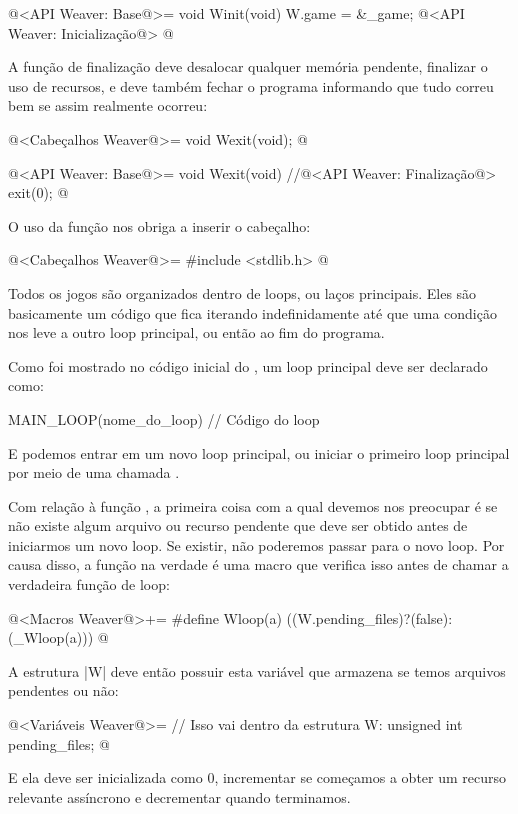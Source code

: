\iniciocodigo
@<API Weaver: Base@>=
void Winit(void){
  W.game = &_game;
  @<API Weaver: Inicialização@>
}
@
\fimcodigo

A função de finalização deve desalocar qualquer memória pendente,
finalizar o uso de recursos, e deve também fechar o programa
informando que tudo correu bem se assim realmente ocorreu:

\iniciocodigo
@<Cabeçalhos Weaver@>=
void Wexit(void);
@
\fimcodigo

\iniciocodigo
@<API Weaver: Base@>=
void Wexit(void){
  //@<API Weaver: Finalização@>
  exit(0);
}
@
\fimcodigo

O uso da função  nos obriga a inserir o cabeçalho:

\iniciocodigo
@<Cabeçalhos Weaver@>=
#include <stdlib.h>
@
\fimcodigo


Todos os jogos são organizados dentro de loops, ou laços
principais. Eles são basicamente um código que fica iterando
indefinidamente até que uma condição nos leve a outro loop principal,
ou então ao fim do programa.

Como foi mostrado no código inicial do , um loop
principal deve ser declarado como:

\inicioverbatim
MAIN\_LOOP(nome\_do\_loop){
  // Código do loop
}
\fimverbatim

E podemos entrar em um novo loop principal, ou iniciar o primeiro loop
principal por meio de uma chamada .

Com relação à função , a primeira coisa com a qual
devemos nos preocupar é se não existe algum arquivo ou recurso
pendente que deve ser obtido antes de iniciarmos um novo loop. Se
existir, não poderemos passar para o novo loop. Por causa disso, a
função  na verdade é uma macro que verifica isso
antes de chamar a verdadeira função de loop:

\iniciocodigo
@<Macros Weaver@>+=
#define Wloop(a) ((W.pending_files)?(false):(_Wloop(a)))
@
\fimcodigo

A estrutura |W| deve então possuir esta variável que armazena se temos
arquivos pendentes ou não:

\iniciocodigo
@<Variáveis Weaver@>=
  // Isso vai dentro da estrutura W:
  unsigned int pending_files;
@
\fimcodigo

E ela deve ser inicializada como 0, incrementar se começamos a obter
um recurso relevante assíncrono e decrementar quando terminamos.

